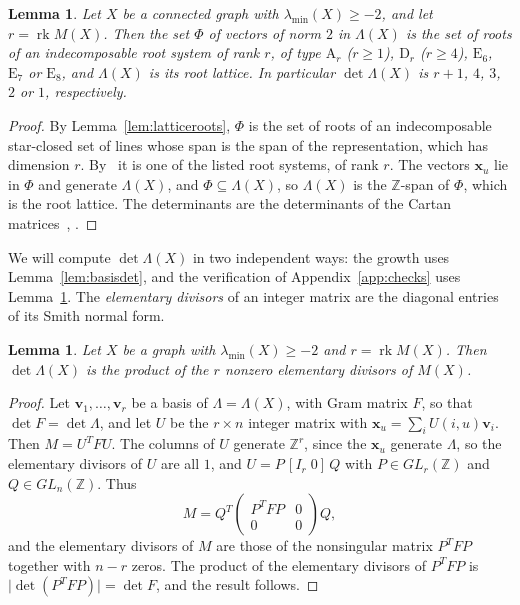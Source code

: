 \documentclass[11pt]{article}
\newcommand\ints{{\mathbb Z}}
\newcommand\Zv{{\mathbf v}}
\newcommand\Zx{{\mathbf x}}
\newcommand\opk[1]{\mathop{\mathrm{#1}}\nolimits}
\newcommand\sbs{\subseteq}
\newcommand\pmat[1]{\begin{pmatrix} #1 \end{pmatrix}}
\newcommand\rk{\opk{rk}}
\newtheorem{lemma}[theorem]{Lemma}
\theoremstyle{definition}
\newcommand{\typ}[1]{\mathrm{#1}}
\newcommand{\lmin}{\lambda_{\min}}
\begin{document}
\begin{lemma}\label{lem:rootlattice}
Let $X$ be a connected graph with $\lmin(X)\ge-2$, and let $r=\rk M(X)$. Then the set $\Phi$ of
vectors of norm $2$ in $\Lambda(X)$ is the set of roots of an indecomposable root system of rank
$r$, of type $\typ A_r$ ($r\ge1$), $\typ D_r$ ($r\ge4$), $\typ E_6$, $\typ E_7$ or $\typ E_8$, and
$\Lambda(X)$ is its root lattice. In particular $\det\Lambda(X)$ is $r+1$, $4$, $3$, $2$ or
$1$, respectively.
\end{lemma}

\begin{proof}
By Lemma~\ref{lem:latticeroots}, $\Phi$ is the set of roots of an indecomposable star-closed set
of lines whose span is the span of the representation, which has dimension $r$. By~\cite[Theorem~3.5]{CGSS} it is one of the listed root systems, of rank $r$. The vectors $\Zx_u$ lie in $\Phi$
and generate $\Lambda(X)$, and $\Phi\sbs\Lambda(X)$, so $\Lambda(X)$ is the $\ints$-span of $\Phi$,
which is the root lattice. The determinants are the determinants of the Cartan matrices~\cite[\S13.1]{Hum72}, \cite[Chapter~4]{CS99}.
\end{proof}

We will compute $\det\Lambda(X)$ in two independent ways: the growth uses
Lemma~\ref{lem:basisdet}, and the verification of Appendix~\ref{app:checks} uses
Lemma~\ref{lem:snf}. The \textsl{elementary divisors} of an integer matrix are the diagonal
entries of its Smith normal form.

\begin{lemma}\label{lem:snf}
Let $X$ be a graph with $\lmin(X)\ge-2$ and $r=\rk M(X)$. Then $\det\Lambda(X)$ is the product
of the $r$ nonzero elementary divisors of $M(X)$.
\end{lemma}

\begin{proof}
Let $\Zv_1,\dots,\Zv_r$ be a basis of $\Lambda=\Lambda(X)$, with Gram matrix $F$, so that
$\det F=\det\Lambda$, and let $U$ be the $r\times n$ integer matrix with
$\Zx_u=\sum_iU(i,u)\Zv_i$. Then $M=U^TFU$. The columns of $U$ generate $\ints^r$, since the
$\Zx_u$ generate $\Lambda$, so the elementary divisors of $U$ are all $1$, and
$U=P\,[I_r\;0]\,Q$ with $P\in GL_r(\ints)$ and $Q\in GL_n(\ints)$. Thus
\[
M=Q^T\pmat{P^TFP&0\\0&0}Q,
\]
and the elementary divisors of $M$ are those of the nonsingular matrix $P^TFP$ together with
$n-r$ zeros. The product of the elementary divisors of $P^TFP$ is
$\lvert\det(P^TFP)\rvert=\det F$, and the result follows.
\end{proof}
\end{document}
